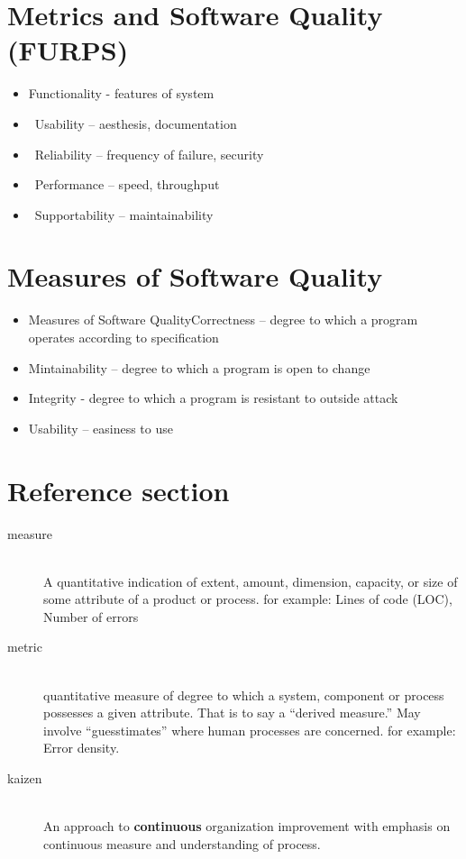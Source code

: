 \documentclass{article}
\begin{document}
\section{Metrics and Software Quality (FURPS)}
\begin{itemize}
  \item Functionality		-	features	of	system	
  \item  Usability	–	aesthesis,	documentation	
  \item  Reliability	–	frequency	of	failure,	security	
  \item  Performance	–	speed,	throughput	
  \item  Supportability	–	maintainability
\end{itemize}

\section{Measures of Software Quality}

\begin{itemize}
  \item Measures of Software QualityCorrectness	–	degree	to	which	a	program	operates	according	to	specification
  \item Mintainability	–	degree	to	which	a	program	is	open	to	change
  \item Integrity	-	degree	to	which	a	program	is	resistant	to	outside	attack	
  \item Usability	–	easiness	to	use
\end{itemize}

\pagebreak

\section*{Reference section} \label{sec:reference}
\begin{description}
	\item[measure] \hfill \\ A quantitative indication of extent, amount, dimension, capacity, or size of some attribute of a product or process. for example: Lines of code (LOC), Number of errors
	\item[metric] \hfill \\ quantitative measure of degree to which a system, component or process possesses a given attribute. That is to say a “derived measure.” May involve “guesstimates” where human processes are concerned. for example: Error density.
	\item[kaizen] \hfill \\ An approach to \textbf{continuous} organization improvement with emphasis on continuous measure and understanding of process.
\end{description}
\end{document}
